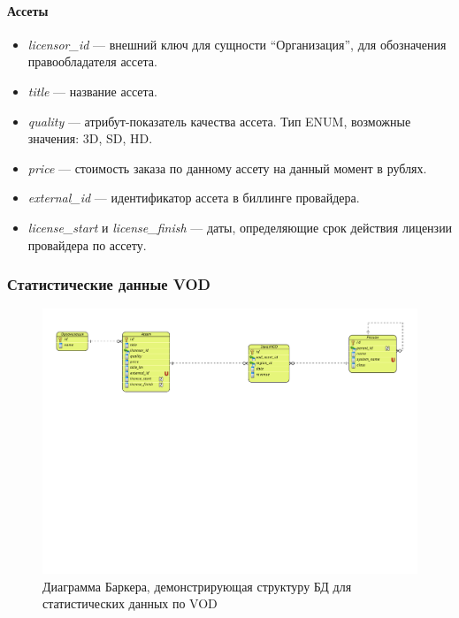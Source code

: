 \paragraph{Ассеты} 
\begin{itemize}
\item{
  \textit{licensor\_id} --- внешний ключ для сущности ``Организация'', для обозначения правообладателя ассета.
}
\item{
  \textit{title} --- название ассета.
}
\item{
  \textit{quality} --- атрибут-показатель качества ассета. Тип ENUM, возможные значения: 3D, SD, HD. 
}
\item{
  \textit{price} --- стоимость заказа по данному ассету на данный момент в рублях.
}
\item{
  \textit{external\_id} --- идентификатор ассета в биллинге провайдера.
}
\item{
  \textit{license\_start} и \textit{license\_finish} --- даты, определяющие срок действия лицензии
провайдера по ассету.
}
\end{itemize}

\newpage

\subsubsection{Статистические данные VOD}
\begin{figure}[!ht]
\begin{center}
\vspace{-0.5cm}
\includegraphics[scale=0.65, trim=10mm 130mm 0mm 10mm, clip]{../resources/uml/VOD_STAT.pdf}
\caption{Диаграмма Баркера, демонстрирующая структуру БД для статистических данных по VOD}
\label{gr:vod_stat}
\end{center} 
\end{figure}

